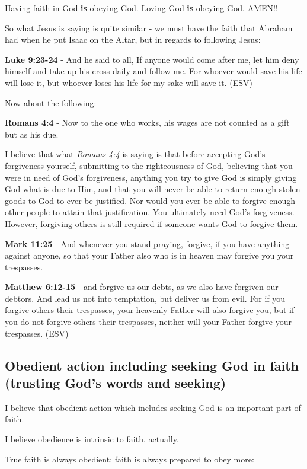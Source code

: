 \documentclass[11pt]{article}
\begin{document}
Having faith in God \textbf{is} obeying God. Loving God \textbf{is} obeying God. AMEN!!

So what Jesus is saying is quite similar - we must have the faith that Abraham had when he put Isaac on the Altar, but in regards to following Jesus:

\textbf{Luke 9:23-24} - And he said to all, If anyone would come after me, let him deny himself and take up his cross daily and follow me. For whoever would save his life will lose it, but whoever loses his life for my sake will save it. (ESV)

Now about the following:

\textbf{Romans 4:4} - Now to the one who works, his wages are not counted as a gift but as his due.

I believe that what \emph{Romans 4:4} is saying is that before accepting God's forgiveness yourself, submitting to the righteousness of God, believing that you were in need of God's forgiveness,
anything you try to give God is simply giving God what is due to Him, and that you will never be able to return enough stolen goods to God to ever be justified. Nor would you ever be able to forgive enough other people to attain that justification.
\uline{You ultimately need God's forgiveness}. However, forgiving others is still required if someone wants God to forgive them.

\textbf{Mark 11:25} - And whenever you stand praying, forgive, if you have anything against anyone, so that your Father also who is in heaven may forgive you your trespasses.

\textbf{Matthew 6:12-15} -  and forgive us our debts, as we also have forgiven our debtors.  And lead us not into temptation, but deliver us from evil.  For if you forgive others their trespasses, your heavenly Father will also forgive you, but if you do not forgive others their trespasses, neither will your Father forgive your trespasses.  (ESV)

\subsection{Obedient action including seeking God in faith (trusting God's words and seeking)}
\label{sec:org7cc3916}
I believe that obedient action which includes seeking God is an important part of faith.

I believe obedience is intrinsic to faith, actually.

True faith is always obedient; faith is always prepared to obey more:
\end{document}
